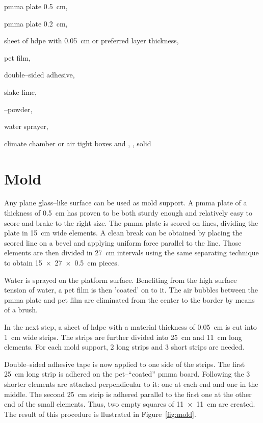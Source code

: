 \documentclass[review]{elsarticle}
\begin{document}
\begin{inparaenum}[(1)]
  \item \gls{pmma} plate \SI{0.5}{\cm},
  \item \gls{pmma} plate \SI{0.2}{\cm},
  \item sheet of \gls{hdpe} with \SI{0.05}{\cm} or preferred layer thickness,
  \item \gls{pet} film,
  \item double--sided adhesive,
  \item slake lime,
  \item {}--powder,
  \item water sprayer,
  \item climate chamber or air tight boxes and , , solid 

\end{inparaenum}


\section{Mold}

Any plane glass--like surface can be used as mold support.
A \gls{pmma} plate of a thickness of \SI{0.5}{\cm} has proven to be both sturdy enough and relatively easy to score and brake to the right size.
The \gls{pmma} plate is scored on lines, dividing the plate in \SI{15}{\cm} wide elements.
A clean break can be obtained by placing the scored line on a bevel and applying uniform force parallel to the line.
Those elements are then divided in \SI{27}{\cm} intervals using the same separating technique to obtain \SI[product-units = single]{15 x 27 x 0.5}{\cm} pieces.

Water is sprayed on the platform surface.
Benefiting from the high surface tension of water, a \gls{pet} film is then 'coated' on to it.
The air bubbles between the \gls{pmma} plate and \gls{pet} film are eliminated from the center to the border by means of a brush.

In the next step, a sheet of \gls{hdpe} with a material thickness of \SI{0.05}{\cm} is cut into \SI{1}{\cm} wide strips.
The strips are further divided into \SI{25}{\cm} and \SI{11}{\cm} long elements.
For each mold support, 2 long strips and 3 short strips are needed.

Double--sided adhesive tape is now applied to one side of the strips.
The first \SI{25}{\cm} long strip is adhered on the \gls{pet}--“coated” \gls{pmma} board.
Following the 3 shorter elements are attached perpendicular to it: one at each end and one in the middle.
The second \SI{25}{\cm} strip is adhered parallel to the first one at the other end of the small elements.
Thus, two empty squares of \SI[product-units = single]{11 x 11}{\cm} are created.
The result of this procedure is llustrated in Figure~\ref{fig:mold}.
\end{document}
